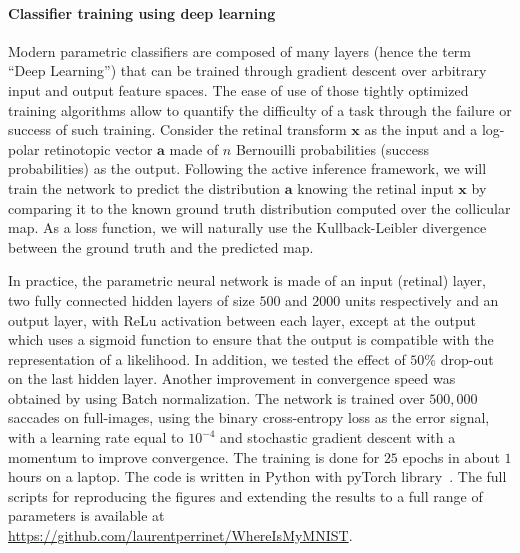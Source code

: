 \paragraph{Classifier training using deep learning}
Modern parametric classifiers are composed of many layers (hence the term ``Deep Learning'') that can be trained through gradient descent over arbitrary input and output feature spaces. The ease of use of those tightly optimized training algorithms allow to quantify the difficulty of a task through the failure or success of such training. Consider the retinal transform $\boldsymbol{x}$ as the input and a log-polar retinotopic vector $\boldsymbol{a}$ made of $n$ Bernouilli probabilities (success probabilities) as the output. Following the active inference framework, we will train the network to predict the distribution $\boldsymbol{a}$ knowing the retinal input $\boldsymbol{x}$ by comparing it to the known ground truth distribution computed over the collicular map. As a loss function, we will naturally use the Kullback-Leibler divergence between the ground truth and the predicted map.

In practice, the parametric neural network is made of an input (retinal) layer, two fully connected hidden layers of size $500$ and $2000$ units respectively and an output layer, with ReLu activation between each layer, except at the output which uses a sigmoid function to ensure that the output is compatible with the representation of a likelihood. In addition, we tested the effect of $50 \%$ drop-out on the last hidden layer. Another improvement in convergence speed was obtained by using Batch normalization. The network is trained over $500,000$ saccades on full-images, using the binary cross-entropy loss as the error signal, with a learning rate equal to $10^{-4}$ and stochastic gradient descent with a momentum to improve convergence. The training is done for $25$ epochs in about $1$ hours on a laptop. The code is written in Python with pyTorch library~\citep{Paszke17}. The full scripts for reproducing the figures and extending the results to a full range of parameters is available at \url{https://github.com/laurentperrinet/WhereIsMyMNIST}. %
